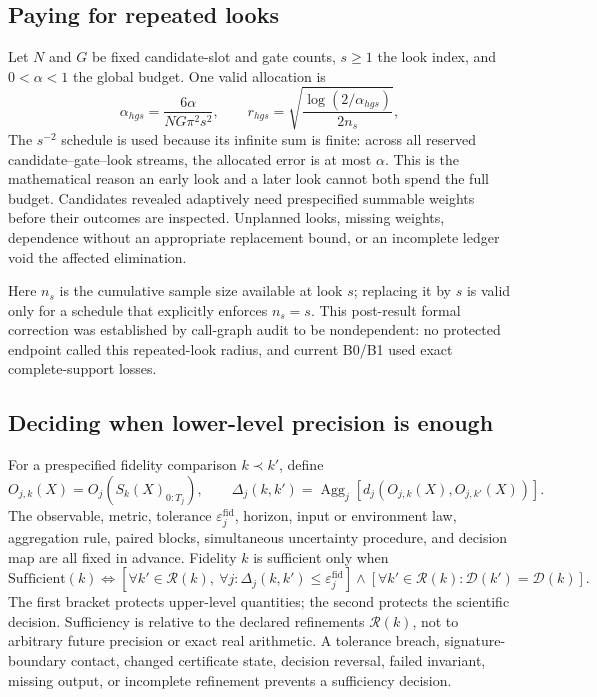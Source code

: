 \documentclass[10pt]{article}
\theoremstyle{definition}
\begin{document}
\subsection{Paying for repeated looks}

Let \(N\) and \(G\) be fixed candidate-slot and gate counts, \(s\ge1\) the look index, and
\(0<\alpha<1\) the global budget. One valid allocation is
\begin{equation}
\alpha_{hgs}=\frac{6\alpha}{NG\pi^2s^2},
\qquad
r_{hgs}=\sqrt{\frac{\log(2/\alpha_{hgs})}{2n_s}},
\label{eq:alpha}
\end{equation}
The \(s^{-2}\) schedule is used because its infinite sum is finite: across all reserved
candidate--gate--look streams, the allocated error is at most \(\alpha\). This is the mathematical
reason an early look and a later look cannot both spend the full budget. Candidates revealed
adaptively need prespecified summable weights before their outcomes are inspected. Unplanned
looks, missing weights, dependence without an appropriate replacement bound, or an incomplete
ledger void the affected elimination.

Here \(n_s\) is the cumulative sample size available at look \(s\); replacing it by \(s\) is valid
only for a schedule that explicitly enforces \(n_s=s\). This post-result formal correction was
established by call-graph audit to be nondependent: no protected endpoint called this
repeated-look radius, and current B0/B1 used exact complete-support losses.

\subsection{Deciding when lower-level precision is enough}

For a prespecified fidelity comparison \(k\prec k'\), define
\[
O_{j,k}(X)=O_j(S_k(X)_{0:T_j}),\qquad
\Delta_j(k,k')=\operatorname{Agg}_j\!\left[d_j(O_{j,k}(X),O_{j,k'}(X))\right].
\]
The observable, metric, tolerance \(\varepsilon^{\mathrm{fid}}_j\), horizon, input or environment law,
aggregation rule, paired blocks, simultaneous uncertainty procedure, and decision map are all fixed in advance. Fidelity \(k\) is
sufficient only when
\begin{equation}
\mathrm{Sufficient}(k)
\Longleftrightarrow
\left[\forall k'\in\mathcal R(k),\ \forall j:\Delta_j(k,k')\le\varepsilon^{\mathrm{fid}}_j\right]
\land
\left[\forall k'\in\mathcal R(k):\mathcal D(k')=\mathcal D(k)\right].
\label{eq:fidelity}
\end{equation}
The first bracket protects upper-level quantities; the second protects the scientific decision.
Sufficiency is relative to the declared refinements \(\mathcal R(k)\), not to arbitrary future
precision or exact real arithmetic. A tolerance breach, signature-boundary contact, changed
certificate state, decision reversal, failed invariant, missing output, or incomplete refinement
prevents a sufficiency decision.
\end{document}
